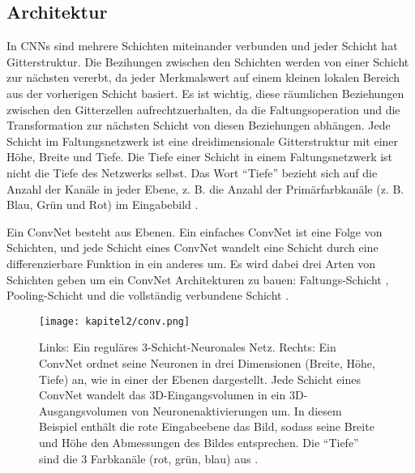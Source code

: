  \subsection{Architektur}
  In CNNs sind mehrere Schichten miteinander verbunden und jeder Schicht hat  Gitterstruktur. Die Bezihungen zwischen den Schichten werden von einer Schicht zur nächsten vererbt, da jeder Merkmalswert auf einem kleinen lokalen Bereich aus der vorherigen Schicht basiert. Es ist wichtig, diese räumlichen Beziehungen zwischen den Gitterzellen aufrechtzuerhalten, da die Faltungsoperation und die Transformation zur nächsten Schicht von diesen Beziehungen abhängen. Jede Schicht im Faltungsnetzwerk ist eine dreidimensionale Gitterstruktur mit einer Höhe, Breite und Tiefe. Die Tiefe einer Schicht in einem Faltungsnetzwerk ist nicht die Tiefe des Netzwerks selbst. Das Wort \enquote{Tiefe} bezieht sich auf die Anzahl der Kanäle in jeder Ebene, z. B. die Anzahl der Primärfarbkanäle (z. B. Blau, Grün und Rot) im Eingabebild \cite*[318]{Aggarwal2018}.

  Ein ConvNet besteht aus Ebenen. Ein einfaches ConvNet ist eine Folge von Schichten, und jede Schicht eines ConvNet wandelt eine Schicht durch eine differenzierbare Funktion in ein anderes um. Es wird dabei drei Arten von Schichten geben um ein ConvNet Architekturen zu bauen: Faltungs-Schicht , Pooling-Schicht und die vollständig verbundene Schicht \cite*{StanfordUniversityCoursecs231n2018a}.

  \begin{figure}[H]
    \centering
    \texttt{[image: kapitel2/conv.png]}
    \caption[Vergleich eines NN mit einem CNN]{Links: Ein reguläres 3-Schicht-Neuronales Netz. Rechts: Ein ConvNet ordnet seine Neuronen in drei Dimensionen (Breite, Höhe, Tiefe) an, wie in einer der Ebenen dargestellt. Jede Schicht eines ConvNet wandelt das 3D-Eingangsvolumen in ein 3D-Ausgangsvolumen von Neuronenaktivierungen um. In diesem Beispiel enthält die rote Eingabeebene das Bild, sodass seine Breite und Höhe den Abmessungen des Bildes entsprechen. Die \enquote{Tiefe} sind die 3 Farbkanäle (rot, grün, blau) aus \cite*{StanfordUniversityCoursecs231n2018a}.}
    \label{Kap2:Conv}
  \end{figure}


